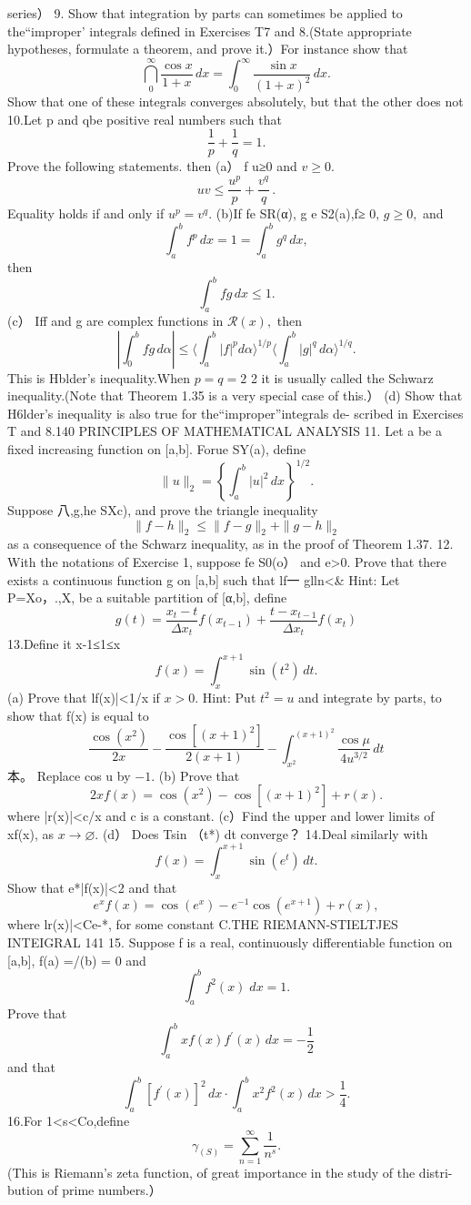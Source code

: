 series） 9. Show that integration by parts can sometimes be applied to the“improper' integrals defined in Exercises T7 and 8.(State appropriate hypotheses, formulate a theorem, and prove it.）For instance show that $$ \bigcap_{0}^{\infty}{\frac{\cos x}{1+x}}\,d x=\int_{0}^{\infty}{\frac{\sin x}{(1+x)^{2}}}\,d x. $$ Show that one of these integrals converges absolutely, but that the other does not 10.Let p and qbe positive real numbers such that $$ {\frac{1}{p}}+{\frac{1}{q}}=1. $$ Prove the following statements. then (a） f u≥0 and $v\geq0.$ $$ u v\leq{\frac{u^{p}}{p}}+{\frac{v^{q}}{q}}\,. $$ Equality holds if and only if $u^{p}=v^{q}.$ (b)If fe SR(α), g e S2(a),f≥ $0,\,g\geq0,$ and $$ \int_{a}^{b}f^{p}\,d x=1=\int_{a}^{b}g^{q}\,d x, $$ then $$ \textstyle{\int_{a}^{b}f g\,d x\leq1.} $$ (c） Iff and g are complex functions in ${\mathcal{R}}(x),$ then $$ \left|\int_{0}^{b}f g\,d\alpha\right|\leq \langle\int_{a}^{b}\left|f\right|^{p}d\alpha \rangle^{1/p} \langle\int_{a}^{b}\left|g\right|^{q}\,d\alpha \rangle^{1/q}. $$ This is Hblder's inequality.When $p=q=2$ 2 it is usually called the Schwarz inequality.(Note that Theorem 1.35 is a very special case of this.） (d) Show that H6lder's inequality is also true for the“improper”integrals de- scribed in Exercises T and 8.140 PRINCIPLES OF MATHEMATICAL ANALYSIS 11. Let a be a fixed increasing function on [a,b]. Forue SY(a), define $$ \|u\|_{2}=\left\{\int_{a}^{b}|u|^{2}\,d x\right\}^{1/2}. $$ Suppose 八,g,he SXc), and prove the triangle inequality $$ \|f-h\|_{2}\leq\|f-g\|_{2}+\|g-h\|_{2} $$ as a consequence of the Schwarz inequality, as in the proof of Theorem 1.37. 12. With the notations of Exercise 1, suppose fe S0(o） and e>0. Prove that there exists a continuous function g on [a,b] such that lf一 glln<& Hint: Let P={Xo，.,X,} be a suitable partition of [α,b], define $$ g(t)={\frac{x_{t}-t}{\Delta x_{t}}}f(x_{t-1})+{\frac{t-x_{t-1}}{\Delta x_{t}}}f(x_{t}) $$ 13.Define it x-1≤1≤x $$ f(x)=\int_{x}^{x+1}\sin{(t^{2})}\,d t. $$ (a) Prove that lf(x)|<1/x if $x>0.$ Hint: Put $\scriptstyle t^{2}=u$ and integrate by parts, to show that f(x) is equal to $$ {\frac{\cos\left(x^{2}\right)}{2x}}-{\frac{\cos\left[\left(x+1\right)^{2}\right]}{2(x+1)}}-\int_{x^{2}}^{(x+1)^{2}}{\frac{\cos\mu}{4u^{3/2}}}\,d t $$ 本。 Replace cos u by $-1.$ (b) Prove that $$ 2x f(x)=\cos\left(x^{2}\right)-\cos\left[(x+1)^{2}\right]+r(x) . $$ where |r(x)|<c/x and c is a constant. (c）Find the upper and lower limits of xf(x), as $x\to\varnothing.$ (d） Does Tsin （t*) dt converge？ 14.Deal similarly with $$ f(x)=\int_{x}^{x+1}\sin{(e^{t})}\,d t. $$ Show that e*|f(x)|<2 and that $$ e^{x}f(x)=\cos\left(e^{x}\right)-e^{-1}\cos\left(e^{x+1}\right)+r(x), $$ where lr(x)|<Ce-*, for some constant C.THE RIEMANN-STIELTJES INTEIGRAL 141 15. Suppose f is a real, continuously differentiable function on [a,b], f(a) =/(b) = 0 and $$ \textstyle\int_{a}^{b}f^{2}(x)\;d x=1. $$ Prove that $$ \int_{a}^{b}x f(x)f^{\prime}(x)\,d x=-{\frac{1}{2}} $$ and that $$ \textstyle\int_{a}^{b}[f^{\prime}(x)]^{2}\,d x\cdot\int_{a}^{b}x^{2}f^{2}(x)\,d x>\frac{1}{4}. $$ 16.For 1<s<Co,define $$ \gamma_{(S)}=\sum_{n=1}^{\infty}{\frac{1}{n^{s}}}. $$ (This is Riemann's zeta function, of great importance in the study of the distri- bution of prime numbers.） 
